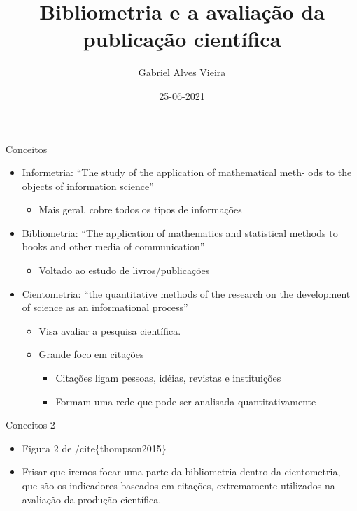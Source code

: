 \documentclass[bigger]{beamer}
\author{Gabriel Alves Vieira}
\date{25-06-2021}
\title{Bibliometria e a avaliação da publicação científica}
\begin{document}
\maketitle
\cite{urbizagastegui}
\cite{garfield1955}
\cite{gracio2016}
\cite{khasseh2017a}
\cite{aria2017a}
\cite{garfield1963}
\cite{pendlebury2009}
\cite{strehl2005}
\cite{teixeiradasilva2020}
\cite{roldan-valadez2019}
\cite{hirsch2005}
\cite{abramo2011}
\cite{butler2007}
\cite{deoliveira2017}
\cite{barata2016}
\cite{perez2020}
\cite{demeis2003}
\cite{trust2020}
\cite{schmid2017}
\cite{hatch2020}


\begin{frame}[label={sec:org781a1c5}]{Conceitos}
\begin{itemize}
\item Informetria: “The study of the application of mathematical meth- ods to the objects of information science”
\begin{itemize}
\item Mais geral, cobre todos os tipos de informações
\end{itemize}
\item Bibliometria: “The application of mathematics and statistical methods to books and other media of communication”
\begin{itemize}
\item Voltado ao estudo de livros/publicações
\end{itemize}
\item Cientometria: “the quantitative methods of the research on the development of science as an informational process”
\begin{itemize}
\item Visa avaliar a pesquisa científica.
\item Grande foco em citações
\begin{itemize}
\item Citações ligam pessoas, idéias, revistas e instituições
\item Formam uma rede que pode ser analisada quantitativamente
\end{itemize}
\end{itemize}
\end{itemize}
\end{frame}

\begin{frame}[label={sec:orgbb3613e}]{Conceitos 2}
\begin{itemize}
\item Figura 2 de /cite\{thompson2015\}
\item Frisar que iremos focar uma parte da bibliometria dentro da cientometria, que são os indicadores baseados em citações, extremamente utilizados na avaliação da produção científica.
\end{itemize}
\end{frame}
\end{document}
